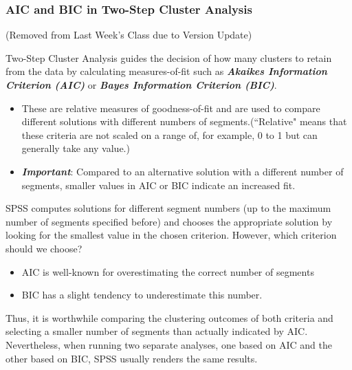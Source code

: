 \documentclass[PredictiveAnalytics101.tex]{subfiles}
\begin{document}
\begin{frame}

\frametitle{AIC and BIC in Two-Step Cluster Analysis}

(Removed from Last Week's Class due to Version Update)

Two-Step Cluster Analysis guides the decision of how many clusters to retain from the data by
calculating measures-of-fit such as \textbf{\textit{Akaikes Information Criterion (AIC)}} or \textbf{\textit{Bayes Information Criterion (BIC)}}.
\end{frame}
\begin{frame}
\Large
\begin{itemize}
\item 
These are relative measures of goodness-of-fit and are used to compare different
solutions with different numbers of segments.(``Relative" means that these criteria
are not scaled on a range of, for example, 0 to 1 but can generally take any value.)

\item 
\textbf{\textit{Important}}: Compared to an alternative solution with a different number of segments, smaller
values in AIC or BIC indicate an increased fit.
\end{itemize}
\end{frame}
\begin{frame}
SPSS computes solutions for different segment numbers (up to the maximum number of segments specified before) and
chooses the appropriate solution by looking for the smallest value in the chosen
criterion. However, which criterion should we choose?
\begin{itemize}
\item AIC is well-known for
overestimating the correct number of segments
\item BIC has a slight tendency
to underestimate this number.
\end{itemize}

Thus, it is worthwhile comparing the clustering
outcomes of both criteria and selecting a smaller number of segments than
actually indicated by AIC. Nevertheless, when running two separate analyses,
one based on AIC and the other based on BIC, SPSS usually renders the same
results.
\end{frame}
\end{document}
